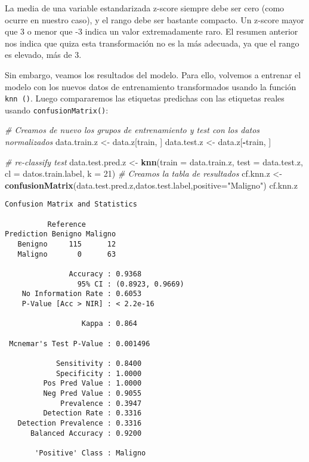 \documentclass[
]{article}
\newenvironment{Shaded}{\begin{snugshade}}{\end{snugshade}}
\newcommand{\CommentTok}[1]{\textcolor[rgb]{0.56,0.35,0.01}{\textit{#1}}}
\newcommand{\DataTypeTok}[1]{\textcolor[rgb]{0.13,0.29,0.53}{#1}}
\newcommand{\DecValTok}[1]{\textcolor[rgb]{0.00,0.00,0.81}{#1}}
\newcommand{\KeywordTok}[1]{\textcolor[rgb]{0.13,0.29,0.53}{\textbf{#1}}}
\newcommand{\NormalTok}[1]{#1}
\newcommand{\OperatorTok}[1]{\textcolor[rgb]{0.81,0.36,0.00}{\textbf{#1}}}
\newcommand{\StringTok}[1]{\textcolor[rgb]{0.31,0.60,0.02}{#1}}
\begin{document}
La media de una variable estandarizada z-score siempre debe ser cero
(como ocurre en nuestro caso), y el rango debe ser bastante compacto. Un
z-score mayor que 3 o menor que -3 indica un valor extremadamente raro.
El resumen anterior nos indica que quiza esta transformación no es la
más adecuada, ya que el rango es elevado, más de 3.

Sin embargo, veamos los resultados del modelo. Para ello, volvemos a
entrenar el modelo con los nuevos datos de entrenamiento transformados
usando la función \texttt{knn\ ()}. Luego compararemos las etiquetas
predichas con las etiquetas reales usando \texttt{confusionMatrix()}:

\begin{Shaded}
\begin{Highlighting}[]
\CommentTok{# Creamos de nuevo los grupos de entrenamiento y test con los datos normalizados }
\NormalTok{data.train.z <-}\StringTok{ }\NormalTok{data.z[train, ]}
\NormalTok{data.test.z <-}\StringTok{ }\NormalTok{data.z[}\OperatorTok{-}\NormalTok{train, ]}

\CommentTok{# re-classify test}
\NormalTok{data.test.pred.z <-}\StringTok{ }\KeywordTok{knn}\NormalTok{(}\DataTypeTok{train =}\NormalTok{ data.train.z, }\DataTypeTok{test =}\NormalTok{ data.test.z,}
                      \DataTypeTok{cl =}\NormalTok{ datos.train.label, }\DataTypeTok{k =} \DecValTok{21}\NormalTok{)}
\CommentTok{# Creamos la tabla de resultados}
\NormalTok{cf.knn.z <-}\StringTok{ }\KeywordTok{confusionMatrix}\NormalTok{(data.test.pred.z,datos.test.label,}\DataTypeTok{positive=}\StringTok{"Maligno"}\NormalTok{)}
\NormalTok{cf.knn.z}
\end{Highlighting}
\end{Shaded}

\begin{verbatim}
Confusion Matrix and Statistics

          Reference
Prediction Benigno Maligno
   Benigno     115      12
   Maligno       0      63
                                          
               Accuracy : 0.9368          
                 95% CI : (0.8923, 0.9669)
    No Information Rate : 0.6053          
    P-Value [Acc > NIR] : < 2.2e-16       
                                          
                  Kappa : 0.864           
                                          
 Mcnemar's Test P-Value : 0.001496        
                                          
            Sensitivity : 0.8400          
            Specificity : 1.0000          
         Pos Pred Value : 1.0000          
         Neg Pred Value : 0.9055          
             Prevalence : 0.3947          
         Detection Rate : 0.3316          
   Detection Prevalence : 0.3316          
      Balanced Accuracy : 0.9200          
                                          
       'Positive' Class : Maligno         
                                          
\end{verbatim}
\end{document}
